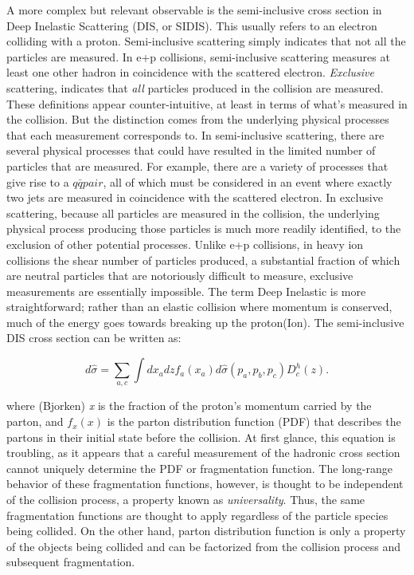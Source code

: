 A more complex but relevant observable is the semi-inclusive cross section in Deep Inelastic Scattering (DIS, or SIDIS). This usually refers to an electron colliding with a proton. Semi-inclusive scattering simply indicates that not all the particles are measured. In e+p collisions, semi-inclusive scattering measures at least one other hadron in coincidence with the scattered electron. \textit{Exclusive} scattering, indicates that \textit{all} particles produced in the collision are measured. These definitions appear counter-intuitive, at least in terms of what's measured in the collision. But the distinction comes from the underlying physical processes that each measurement corresponds to. In semi-inclusive scattering, there are several physical processes that could have resulted in the limited number of particles that are measured. For example, there are a variety of processes that give rise to a $q\bar{q} pair$, all of which must be considered in an event where exactly two jets are measured in coincidence with the scattered electron. In exclusive scattering, because all particles are measured in the collision, the underlying physical process producing those particles is much  more readily identified, to the exclusion of other potential processes. Unlike e+p collisions, in heavy ion collisions the shear number of particles produced, a substantial fraction of which are neutral particles that are notoriously difficult to measure, exclusive measurements are essentially impossible. The term Deep Inelastic is more straightforward; rather than an elastic collision where momentum is conserved, much of the energy goes towards breaking up the proton(Ion). The semi-inclusive DIS cross section can be written as:

  \begin{equation}
    d\hat{\sigma}= \sum_{a,c} \int dx_a dz f_a(x_a) d\hat{\sigma}(p_a,p_b,p_c) D_c^h(z).
    \label{sidis_cross_section}
  \end{equation}

  where (Bjorken) \textit{x} is the fraction of the proton’s momentum carried by the parton, and $f_x(x)$ is the parton distribution function (PDF) that describes the partons in their initial state before the collision. At first glance, this equation is troubling, as it appears that a careful measurement of the hadronic cross section cannot uniquely determine the PDF or fragmentation function. The long-range behavior of these fragmentation functions, however, is thought to be independent of the collision process, a property known as \textit{universality}. Thus, the same fragmentation functions are thought to apply regardless of the particle species being collided. On the other hand, parton distribution function is only a property of the objects being collided and can be factorized from the collision process and subsequent fragmentation. 
 
